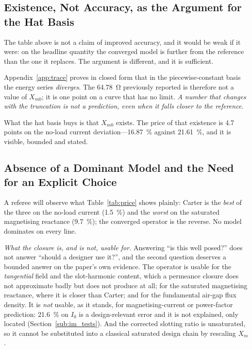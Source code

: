 \documentclass[10pt,a4paper,twocolumn]{article}
\theoremstyle{plain}
\theoremstyle{remark}
\begin{document}
\subsection{Existence, Not Accuracy, as the Argument for the Hat Basis}

The table above is not a claim of improved accuracy, and it would be
weak if it were: on the headline quantity the converged model is further
from the reference than the one it replaces. The argument is different,
and it is sufficient.

Appendix~\ref{app:trace} proves in closed form that in the
piecewise-constant basis the energy series \emph{diverges}. The
\SI{64.78}{\ohm} previously reported is therefore not a value of
$X_{m0}$; it is one point on a curve that has no limit. \emph{A number
that changes with the truncation is not a prediction, even when it falls
closer to the reference.}

What the hat basis buys is that $X_{m0}$ exists. The price of that
existence is \num{4.7} points on the no-load current
deviation---\SI{+16.87}{\percent} against \SI{+21.61}{\percent}, and
it is visible, bounded and stated.

\subsection{Absence of a Dominant Model and the Need for an Explicit Choice}

A referee will observe what Table~\ref{tab:price} shows plainly: Carter
is the \emph{best} of the three on the no-load current
(\SI{+1.5}{\percent}) and the \emph{worst} on the saturated magnetising
reactance (\SI{+9.7}{\percent}); the converged operator is the reverse.
No model dominates on every line.

\emph{What the closure is, and is not, usable for.} Answering ``is this
well posed?'' does not answer ``should a designer use it?'', and the
second question deserves a bounded answer on the paper's own evidence.
The operator is usable for the \emph{tangential} field and the
slot-harmonic content, which a permeance closure does not approximate
badly but does not produce at all; for the saturated magnetising
reactance, where it is closer than Carter; and for the fundamental
air-gap flux density. It is \emph{not} usable, as it stands, for
magnetising-current or power-factor prediction: \SI{+21.6}{\percent} on
$I_0$ is a design-relevant error and it is not explained, only located
(Section~\ref{sub:im_tests}). And the corrected slotting ratio is
unsaturated, so it cannot be substituted into a classical saturated
design chain by rescaling $X_m$.
\end{document}
